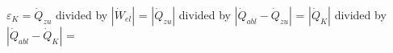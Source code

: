 \( \varepsilon_K = \dot{Q}_{zu} \) divided by \( |\dot{W}_{el}| \) = \( |\dot{Q}_{zu}| \) divided by \( |\dot{Q}_{abl} - \dot{Q}_{zu}| \) = \( |\dot{Q}_{K}| \) divided by \( |\dot{Q}_{abl} - \dot{Q}_{K}| \)  
=